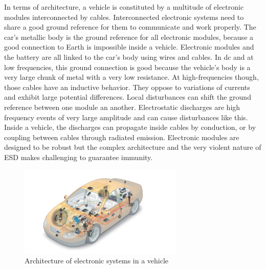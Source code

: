 In terms of architecture, a vehicle is constituted by a multitude of electronic modules interconnected by cables.
Interconnected electronic systems need to share a good ground reference for them to communicate and work properly.
The car's metallic body is the ground reference for all electronic modules, because a good connection to Earth is impossible inside a vehicle.
Electronic modules and the battery are all linked to the car's body using wires and cables.
In \gls{dc} and at low frequencies, this ground connection is good because the vehicle's body is a very large chunk of metal with a very low resistance.
At high-frequencies though, those cables have an inductive behavior.
They oppose to variations of currents and exhibit large potential differences.
Local disturbances can shift the ground reference between one module an another.
Electrostatic discharges are high frequency events of very large amplitude and can cause disturbances like this.
Inside a vehicle, the discharges can propagate inside cables by conduction, or by coupling between cables through radiated emission.
Electronic modules are designed to be robust but the complex architecture and the very violent nature of ESD makes challenging to guarantee immunity.

\begin{figure}[!h]
  \centering
  \includegraphics[width=0.7\textwidth]{src/1/figures/systemintegration_01_uv-data.jpg}
  \caption{Architecture of electronic systems in a vehicle \cite{car-architecture}}
  \label{fig:car-architecture}
\end{figure}

